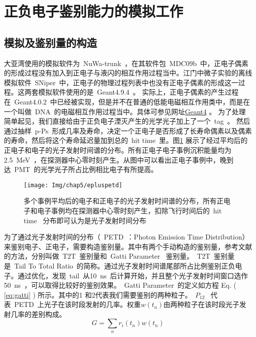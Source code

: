 \section{正负电子鉴别能力的模拟工作}
\subsection{模拟及鉴别量的构造}
大亚湾使用的模拟软件为~NuWa-trunk~，在其软件包~MDC09b~中，正电子偶素的形成过程没有加入到正电子与液闪的相互作用过程当中。江门中微子实验的离线模拟软件~SNiper~中，正电子的物理过程列表中也没有正电子偶素的形成这一过程。这两套模拟软件使用的是~Geant4.9.4~。 实际上，正电子偶素的产生过程在~Geant4.0.2~中已经被实现，但是并不在普通的低能电磁相互作用类中，而是在一个叫做~DNA~的电磁相互作用过程当中。具体可参见网址\href{www.geant4.org/geant4/support/ReleaseNotes4.9.2.h}{Geant4} \citep{lalaGeant4}。
为了处理简单起见，我们直接给由于正负电子湮灭产生的光学光子加上了一个~tag~。 然后通过抽样~p-Ps~形成几率及寿命，决定一个正电子是否形成了长寿命偶素以及偶素的寿命，然后将这个寿命延迟量加到总的~hit time~里。图\ref{fig:p56} 展示了经过平均后的正电子和电子的光子发射时间谱的分布。所有正电子电子事例沉积能量均为2.5~MeV~，在探测器中心零时刻产生。从图中可以看出正电子事例中，晚到达~PMT~的光学光子所占比例相比电子有所提高。
\begin{figure}[!htbp]
  \centering
   \texttt{[image: Img/chap5/epluspetd]}
    \caption{多个事例平均后的电子和正电子的光子发射时间谱的分布，所有正电子和电子事例均在探测器中心零时刻产生，扣除飞行时间后的~hit time~ 分布即可认为是光子发射时间分布}
  \label{fig:p56}
\end{figure}
为了通过光子发射时间的分布（~PETD~：Photon Emission Time Distribution）来鉴别电子、正电子，需要构造鉴别量。其中有两个手动构造的鉴别量，参考文献\citep{gatti1961new} 的方法，分别叫做~T2T~鉴别量和~Gatti Parameter~ 鉴别量。~T2T~鉴别量是~Tail To Total Ratio~的简称。通过光子发射时间谱尾部所占比例鉴别正负电子。通过优化，发现~tail~从10~ns~后计算开始，并且整个光子发射时间窗口选作50~ns~，可以取得比较好的鉴别效果。~Gatti Parameter~的定义如方程 Eq. ( \ref{eq:gatti} ) 所示。其中的1 和2代表我们需要鉴别的两种粒子。~$P_{12}$~ 代表~PETD~上光子在该时段发射的几率。权重$w(t_{n})$由两种粒子在该时段光子发射几率的差别构成。
\begin{equation}\label{eq:gatti}
G=\sum_{n}{r_{i}(t_{n})w(t_{n})}
\end{equation}


